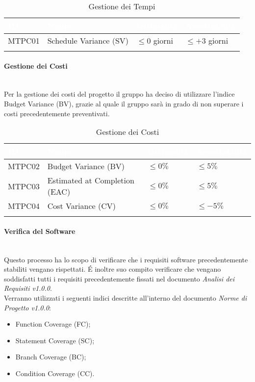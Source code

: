 \begin{longtable}{|C{.15\textwidth}|C{.24\textwidth}|C{.24\textwidth}|C{.24\textwidth}|}
\hline
{}\textbf{\textcolor{white}{ID}} & \textbf{\textcolor{white}{Nome}} & \textbf{\textcolor{white}{Ottimalità}} & \textbf{\textcolor{white}{Accettabilità}}\\
\hline \hline
\endfirsthead
MTPC01 & Schedule Variance (SV) & $\leqslant 0$ giorni & $\leqslant +3$ giorni \\
\hline
\caption{Gestione dei Tempi}
\label{GestioneTempi}
\end{longtable}

\paragraph{Gestione dei Costi} \-\\
Per la gestione dei costi del progetto il gruppo ha deciso di utilizzare l'indice Budget Variance (BV), grazie al quale il gruppo sarà in grado di non superare i costi precedentemente preventivati.  

\begin{longtable}{|C{.15\textwidth}|C{.24\textwidth}|C{.24\textwidth}|C{.24\textwidth}|}
\hline
{}\textbf{\textcolor{white}{ID}} & \textbf{\textcolor{white}{Nome}} & \textbf{\textcolor{white}{Ottimalità}} & \textbf{\textcolor{white}{Accettabilità}}\\
\hline \hline
\endfirsthead
MTPC02 & Budget Variance (BV) & $\leqslant 0\% $ & $\leqslant 5\%$ \\
\hline
{} MTPC03 & Estimated at Completion (EAC) & $\leqslant 0\% $ & $\leqslant 5\%$ \\
\hline
MTPC04 & Cost Variance (CV) & $\leqslant 0\% $ & $ \leqslant -5\%$ \\
\hline
\caption{Gestione dei Costi}
\label{GestioneCosti}
\end{longtable}

\paragraph{Verifica del Software}\-\\
\label{VerificaSoftwareCap}
Questo processo ha lo scopo di verificare che i requisiti software precedentemente stabiliti vengano rispettati. \'E inoltre suo compito verificare che vengano soddisfatti tutti i requisiti precedentemente fissati nel documento \textit{Analisi dei Requisiti v1.0.0}.\\
Verranno utilizzati i seguenti indici descritte all'interno del documento \textit{Norme di Progetto v1.0.0}:
\begin{itemize}
	\item Function Coverage (FC);
	\item Statement Coverage (SC);
	\item Branch Coverage (BC);
	\item Condition Coverage (CC).
\end{itemize}


